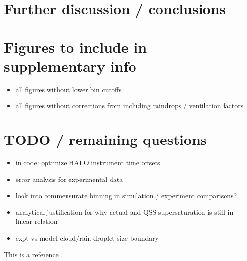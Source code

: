 \documentclass{article}
\begin{document}
\section{Further discussion / conclusions}

\section{Figures to include in supplementary info}
\begin{itemize}
	\item all figures without lower bin cutoffs
	\item all figures without corrections from including raindrops / ventilation factors
\end{itemize}
\section{TODO / remaining questions}
\begin{itemize}
	\item in code: optimize HALO instrument time offsets
	\item error analysis for experimental data
	\item look into commensurate binning in simulation / experiment comparisons?
	\item analytical justification for why actual and QSS supersaturation is still in linear relation
	\item expt vs model cloud/rain droplet size boundary
\end{itemize}
This is a reference \cite{Fan2018}.



\end{document}
